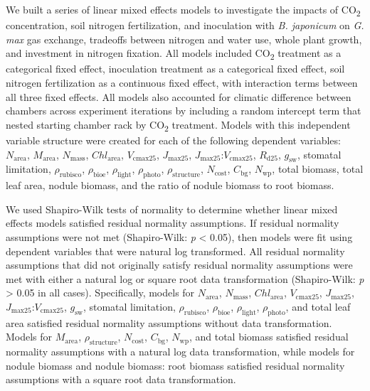     We built a series of linear mixed effects models to investigate the impacts of CO\textsubscript{2} concentration, soil nitrogen fertilization, and inoculation with \textit{B. japonicum} on \textit{G. max} gas exchange, tradeoffs between nitrogen and water use, whole plant growth, and investment in nitrogen fixation. All models included CO\textsubscript{2} treatment as a categorical fixed effect, inoculation treatment as a categorical fixed effect, soil nitrogen fertilization as a continuous fixed effect, with interaction terms between all three fixed effects. All models also accounted for climatic difference between chambers across experiment iterations by including a random intercept term that nested starting chamber rack by CO\textsubscript{2} treatment. Models with this independent variable structure were created for each of the following dependent variables: $N_\mathrm{area}$, $M_\mathrm{area}$, $N_\mathrm{mass}$, $Chl_\mathrm{area}$, $V_\mathrm{cmax25}$, $J_\mathrm{max25}$, $J_\mathrm{max25}$:$V_\mathrm{cmax25}$, $R_\mathrm{d25}$, $g_\mathrm{sw}$, stomatal limitation, $\rho_\mathrm{rubisco}$, $\rho_\mathrm{bioe}$, $\rho_\mathrm{light}$, $\rho_\mathrm{photo}$, $\rho_\mathrm{structure}$, $N_\mathrm{cost}$, $C_\mathrm{bg}$, $N_\mathrm{wp}$, total biomass, total leaf area, nodule biomass, and the ratio of nodule biomass to root biomass.

    We used Shapiro-Wilk tests of normality to determine whether linear mixed effects models satisfied residual normality assumptions. If residual normality assumptions were not met (Shapiro-Wilk: \textit{p} < 0.05), then models were fit using dependent variables that were natural log transformed. All residual normality assumptions that did not originally satisfy residual normality assumptions were met with either a natural log or square root data transformation (Shapiro-Wilk: \textit{p} > 0.05 in all cases). Specifically, models for $N_\mathrm{area}$, $N_\mathrm{mass}$, $Chl_\mathrm{area}$, $V_\mathrm{cmax25}$, $J_\mathrm{max25}$, $J_\mathrm{max25}$:$V_\mathrm{cmax25}$, $g_\mathrm{sw}$, stomatal limitation, $\rho_\mathrm{rubisco}$, $\rho_\mathrm{bioe}$, $\rho_\mathrm{light}$, $\rho_\mathrm{photo}$, and total leaf area satisfied residual normality assumptions without data transformation. Models for $M_\mathrm{area}$, $\rho_\mathrm{structure}$, $N_\mathrm{cost}$, $C_\mathrm{bg}$, $N_\mathrm{wp}$, and total biomass satisfied residual normality assumptions with a natural log data transformation, while models for nodule biomass and nodule biomass: root biomass satisfied residual normality assumptions with a square root data transformation.

